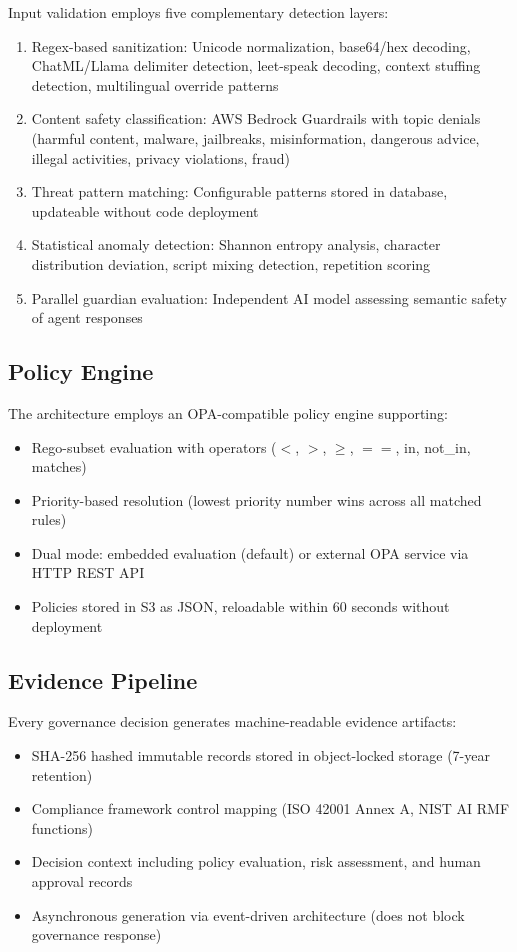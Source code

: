 \documentclass[conference]{IEEEtran}
\begin{document}
Input validation employs five complementary detection layers:

\begin{enumerate}
\item Regex-based sanitization: Unicode normalization, base64/hex decoding, ChatML/Llama delimiter detection, leet-speak decoding, context stuffing detection, multilingual override patterns
\item Content safety classification: AWS Bedrock Guardrails with topic denials (harmful content, malware, jailbreaks, misinformation, dangerous advice, illegal activities, privacy violations, fraud)
\item Threat pattern matching: Configurable patterns stored in database, updateable without code deployment
\item Statistical anomaly detection: Shannon entropy analysis, character distribution deviation, script mixing detection, repetition scoring
\item Parallel guardian evaluation: Independent AI model assessing semantic safety of agent responses
\end{enumerate}

\subsection{Policy Engine}

The architecture employs an OPA-compatible policy engine supporting:

\begin{itemize}
\item Rego-subset evaluation with operators ($<$, $>$, $\geq$, $==$, in, not\_in, matches)
\item Priority-based resolution (lowest priority number wins across all matched rules)
\item Dual mode: embedded evaluation (default) or external OPA service via HTTP REST API
\item Policies stored in S3 as JSON, reloadable within 60 seconds without deployment
\end{itemize}

\subsection{Evidence Pipeline}

Every governance decision generates machine-readable evidence artifacts:

\begin{itemize}
\item SHA-256 hashed immutable records stored in object-locked storage (7-year retention)
\item Compliance framework control mapping (ISO 42001 Annex A, NIST AI RMF functions)
\item Decision context including policy evaluation, risk assessment, and human approval records
\item Asynchronous generation via event-driven architecture (does not block governance response)
\end{itemize}
\end{document}
